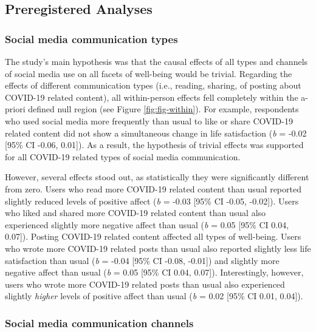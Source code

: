\documentclass[
  man,mask,floatsintext]{apa7}
\begin{document}
\hypertarget{preregistered-analyses}{%
\subsection{Preregistered Analyses}\label{preregistered-analyses}}

\hypertarget{social-media-communication-types}{%
\subsubsection{Social media communication types}\label{social-media-communication-types}}

The study's main hypothesis was that the causal effects of all types and channels of social media use on all facets of well-being would be trivial.
Regarding the effects of different communication types (i.e., reading, sharing, of posting about COVID-19 related content), all within-person effects fell completely within the a-priori defined null region (see Figure \ref{fig:fig-within}).
For example, respondents who used social media more frequently than usual to like or share COVID-19 related content did not show a simultaneous change in life satisfaction (\emph{b} = -0.02 {[}95\% CI -0.06, 0.01{]}).
As a result, the hypothesis of trivial effects was supported for all COVID-19 related types of social media communication.

However, several effects stood out, as statistically they were significantly different from zero.
Users who read more COVID-19 related content than usual reported slightly reduced levels of positive affect (\emph{b} = -0.03 {[}95\% CI -0.05, -0.02{]}).
Users who liked and shared more COVID-19 related content than usual also experienced slightly more negative affect than usual (\emph{b} = 0.05 {[}95\% CI 0.04, 0.07{]}).
Posting COVID-19 related content affected all types of well-being.
Users who wrote more COVID-19 related posts than usual also reported slightly less life satisfaction than usual (\emph{b} = -0.04 {[}95\% CI -0.08, -0.01{]}) and slightly more negative affect than usual (\emph{b} = 0.05 {[}95\% CI 0.04, 0.07{]}).
Interestingly, however, users who wrote more COVID-19 related posts than usual also experienced slightly \emph{higher} levels of positive affect than usual (\emph{b} = 0.02 {[}95\% CI 0.01, 0.04{]}).

\hypertarget{social-media-communication-channels}{%
\subsubsection{Social media communication channels}\label{social-media-communication-channels}}
\end{document}
